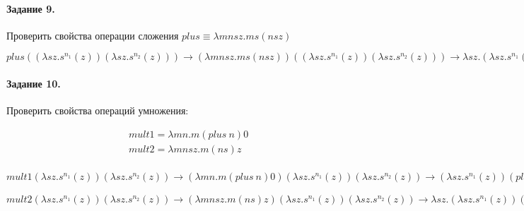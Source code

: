 \documentclass[a4paper,12pt]{article}
\begin{document}
\paragraph{Задание 9.} Проверить свойства операции сложения $plus \equiv \lambda mnsz . ms \left(nsz\right)$

\begin{Solution}

$plus \left(\left(\lambda sz . s^{n_1}\left(z\right)\right)\left(\lambda sz . s^{n_2}\left(z\right)\right)\right) \rightarrow \left(\lambda mnsz . ms \left(nsz\right)\right) \left(\left(\lambda sz . s^{n_1}\left(z\right)\right)\left(\lambda sz . s^{n_2}\left(z\right)\right)\right) \rightarrow \lambda sz . \left(\lambda sz . s^{n_1}\left(z\right)\right)s \left(\left(\lambda sz . s^{n_2}\left(z\right)\right)sz\right) \rightarrow \lambda sz . \left(\lambda z . s^{n_1}\left(z\right)\right) \left(s^{n_2}\left(z\right)\right) \rightarrow \lambda sz . s^{n_1 + n_2} \left(z\right)$

\end{Solution}

\paragraph{Задание 10.} Проверить свойства операций умножения:

\[
	\begin{split}
		&mult1 = \lambda mn . m\left(plus ~n\right) 0\\
		&mult2 = \lambda mnsz . m \left(ns\right) z\\
	\end{split}
\]

\begin{Solution}

$mult1 \left(\lambda sz . s^{n_1}\left(z\right)\right)\left(\lambda sz . s^{n_2}\left(z\right)\right) \rightarrow \left(\lambda mn . m\left(plus ~n\right) 0\right) \left(\lambda sz . s^{n_1}\left(z\right)\right)\left(\lambda sz . s^{n_2}\left(z\right)\right) \rightarrow \left(\lambda sz . s^{n_1}\left(z\right)\right)\left(plus \left(\lambda sz . s^{n_2}\left(z\right)\right)\right) 0 \rightarrow \left(plus \left(\lambda sz . s^{n_2}\left(z\right)\right)\right)^{n_1}\left(0\right) \rightarrow \lambda sz . s^{n_1 \times n_2}\left(z\right)$

$mult2 \left(\lambda sz . s^{n_1}\left(z\right)\right)\left(\lambda sz . s^{n_2}\left(z\right)\right) \rightarrow \left(\lambda mnsz . m \left(ns\right) z\right) \left(\lambda sz . s^{n_1}\left(z\right)\right)\left(\lambda sz . s^{n_2}\left(z\right)\right) \rightarrow \lambda sz . \left(\lambda sz . s^{n_1}\left(z\right)\right) \left(\left(\lambda sz . s^{n_2}\left(z\right)\right)s\right) z \rightarrow \lambda sz . \left(\lambda sz . s^{n_1}\left(z\right)\right) \left(\lambda z . s^{n_2}\left(z\right)\right) z \rightarrow \lambda sz . \left(\left(\lambda z . s^{n_2}\left(z\right)\right)^{n_1}\left(z\right)\right)\rightarrow \lambda sz . s^{n_1 \times n_2}\left(z\right)$

\end{Solution}
\end{document}
